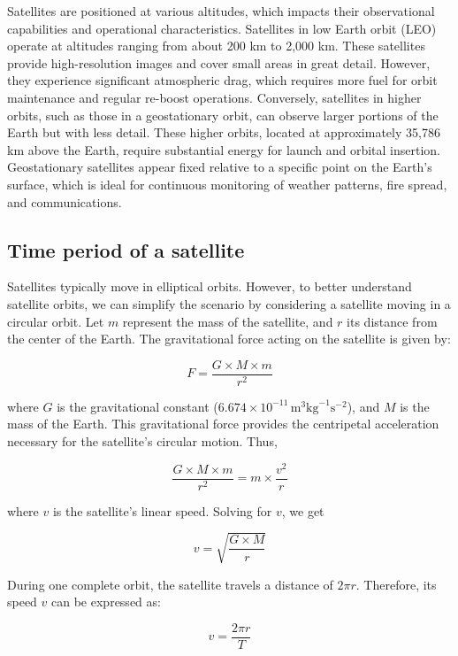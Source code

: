 \documentclass[
  12 pt,
]{Nemilov}
\begin{document}
Satellites are positioned at various altitudes, which impacts their observational capabilities and operational characteristics. Satellites in low Earth orbit (LEO) operate at altitudes ranging from about 200 km to 2,000 km. These satellites provide high-resolution images and cover small areas in great detail. However, they experience significant atmospheric drag, which requires more fuel for orbit maintenance and regular re-boost operations. Conversely, satellites in higher orbits, such as those in a geostationary orbit, can observe larger portions of the Earth but with less detail. These higher orbits, located at approximately 35,786 km above the Earth, require substantial energy for launch and orbital insertion. Geostationary satellites appear fixed relative to a specific point on the Earth's surface, which is ideal for continuous monitoring of weather patterns, fire spread, and communications.

\subsection{Time period of a satellite}\label{time-period-of-a-satellite}

Satellites typically move in elliptical orbits. However, to better understand satellite orbits, we can simplify the scenario by considering a satellite moving in a circular orbit. Let \(m\) represent the mass of the satellite, and \(r\) its distance from the center of the Earth. The gravitational force acting on the satellite is given by:

\[
F = \frac{G \times M \times m}{r^2}
\]

where \(G\) is the gravitational constant (\(6.674 \times 10^{-11} \, \text{m}^3 \text{kg}^{-1} \text{s}^{-2}\)), and \(M\) is the mass of the Earth. This gravitational force provides the centripetal acceleration necessary for the satellite's circular motion. Thus,

\[
\frac{G \times M \times m}{r^2} = m \times \frac{v^2}{r}
\]

where \(v\) is the satellite's linear speed. Solving for \(v\), we get

\[
v = \sqrt{\frac{G \times M}{r}}
\]

During one complete orbit, the satellite travels a distance of \(2 \pi r\). Therefore, its speed \(v\) can be expressed as:

\[
v = \frac{2 \pi r}{T}
\]
\end{document}
